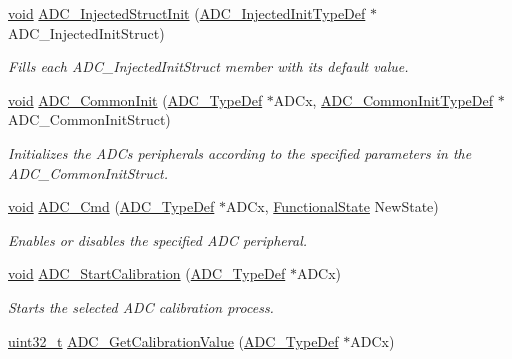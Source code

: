 \begin{DoxyCompactItemize}
\hyperlink{group___n_a_m_e_ga18028b8badbf1ea7e704ccac3c488e82}{void} \hyperlink{group___a_d_c___exported___constants_ga63b4c2f94f1ff519897199c894d28ca6}{A\-D\-C\-\_\-\-Injected\-Struct\-Init} (\hyperlink{struct_a_d_c___injected_init_type_def}{A\-D\-C\-\_\-\-Injected\-Init\-Type\-Def} $\ast$A\-D\-C\-\_\-\-Injected\-Init\-Struct)
\begin{DoxyCompactList}\small\item\em Fills each A\-D\-C\-\_\-\-Injected\-Init\-Struct member with its default value. \end{DoxyCompactList}\item 
\hyperlink{group___n_a_m_e_ga18028b8badbf1ea7e704ccac3c488e82}{void} \hyperlink{group___a_d_c___exported___constants_ga0cdd00fe5c46fd826c3bf2ba2454b8b9}{A\-D\-C\-\_\-\-Common\-Init} (\hyperlink{struct_a_d_c___type_def}{A\-D\-C\-\_\-\-Type\-Def} $\ast$A\-D\-Cx, \hyperlink{struct_a_d_c___common_init_type_def}{A\-D\-C\-\_\-\-Common\-Init\-Type\-Def} $\ast$A\-D\-C\-\_\-\-Common\-Init\-Struct)
\begin{DoxyCompactList}\small\item\em Initializes the A\-D\-Cs peripherals according to the specified parameters in the A\-D\-C\-\_\-\-Common\-Init\-Struct. \end{DoxyCompactList}\item 
\hyperlink{group___n_a_m_e_ga18028b8badbf1ea7e704ccac3c488e82}{void} \hyperlink{group___a_d_c___exported___constants_ga40882d399e3371755ed610c1134e634e}{A\-D\-C\-\_\-\-Cmd} (\hyperlink{struct_a_d_c___type_def}{A\-D\-C\-\_\-\-Type\-Def} $\ast$A\-D\-Cx, \hyperlink{group___exported__types_gac9a7e9a35d2513ec15c3b537aaa4fba1}{Functional\-State} New\-State)
\begin{DoxyCompactList}\small\item\em Enables or disables the specified A\-D\-C peripheral. \end{DoxyCompactList}\item 
\hyperlink{group___n_a_m_e_ga18028b8badbf1ea7e704ccac3c488e82}{void} \hyperlink{group___a_d_c___exported___constants_gadcba6341124a6aabfd2dd885ca8e5f14}{A\-D\-C\-\_\-\-Start\-Calibration} (\hyperlink{struct_a_d_c___type_def}{A\-D\-C\-\_\-\-Type\-Def} $\ast$A\-D\-Cx)
\begin{DoxyCompactList}\small\item\em Starts the selected A\-D\-C calibration process. \end{DoxyCompactList}\item 
\hyperlink{stdint_8h_a435d1572bf3f880d55459d9805097f62}{uint32\-\_\-t} \hyperlink{group___a_d_c___exported___constants_gaf53dfffb144a9f75124c08e849aeebe7}{A\-D\-C\-\_\-\-Get\-Calibration\-Value} (\hyperlink{struct_a_d_c___type_def}{A\-D\-C\-\_\-\-Type\-Def} $\ast$A\-D\-Cx)

\end{DoxyCompactItemize}
